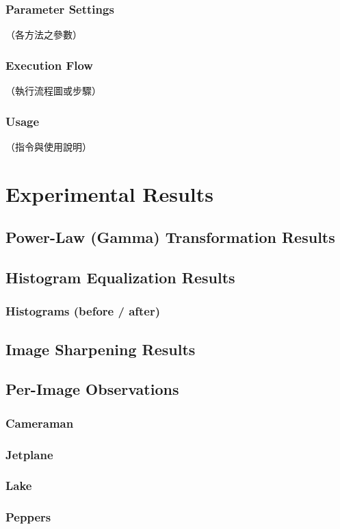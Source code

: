 \documentclass[12pt,a4paper]{article}
\begin{document}
\subsubsection{Parameter Settings}
（各方法之參數）
\subsubsection{Execution Flow}
（執行流程圖或步驟）
\subsubsection{Usage}
（指令與使用說明）

\section{Experimental Results}
\subsection{Power-Law (Gamma) Transformation Results}
\subsection{Histogram Equalization Results}
\subsubsection{Histograms (before / after)}
\subsection{Image Sharpening Results}
\subsection{Per-Image Observations}
\subsubsection{Cameraman}\subsubsection{Jetplane}\subsubsection{Lake}\subsubsection{Peppers}
\end{document}
